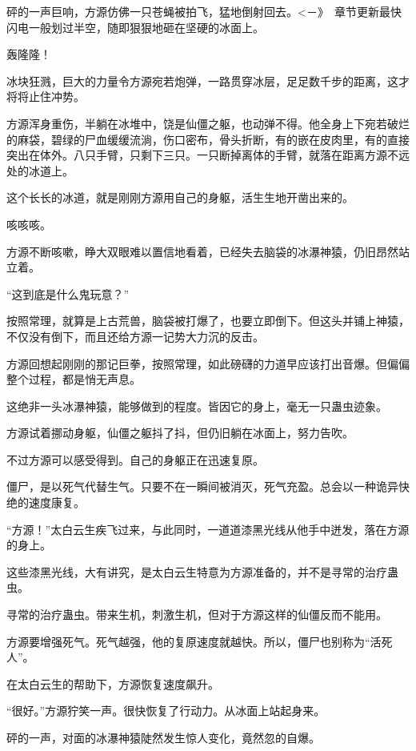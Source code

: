 
\begin{this_body}

砰的一声巨响，方源仿佛一只苍蝇被拍飞，猛地倒射回去。<－》　章节更新最快闪电一般划过半空，随即狠狠地砸在坚硬的冰面上。

轰隆隆！

冰块狂溅，巨大的力量令方源宛若炮弹，一路贯穿冰层，足足数千步的距离，这才将将止住冲势。

方源浑身重伤，半躺在冰堆中，饶是仙僵之躯，也动弹不得。他全身上下宛若破烂的麻袋，碧绿的尸血缓缓流淌，伤口密布，骨头折断，有的嵌在皮肉里，有的直接突出在体外。八只手臂，只剩下三只。一只断掉离体的手臂，就落在距离方源不远处的冰道上。

这个长长的冰道，就是刚刚方源用自己的身躯，活生生地开凿出来的。

咳咳咳。

方源不断咳嗽，睁大双眼难以置信地看着，已经失去脑袋的冰瀑神猿，仍旧昂然站立着。

“这到底是什么鬼玩意？”

按照常理，就算是上古荒兽，脑袋被打爆了，也要立即倒下。但这头并铺上神猿，不仅没有倒下，而且还给方源一记势大力沉的反击。

方源回想起刚刚的那记巨拳，按照常理，如此磅礴的力道早应该打出音爆。但偏偏整个过程，都是悄无声息。

这绝非一头冰瀑神猿，能够做到的程度。皆因它的身上，毫无一只蛊虫迹象。

方源试着挪动身躯，仙僵之躯抖了抖，但仍旧躺在冰面上，努力告吹。

不过方源可以感受得到。自己的身躯正在迅速复原。

僵尸，是以死气代替生气。只要不在一瞬间被消灭，死气充盈。总会以一种诡异快绝的速度康复。

“方源！”太白云生疾飞过来，与此同时，一道道漆黑光线从他手中迸发，落在方源的身上。

这些漆黑光线，大有讲究，是太白云生特意为方源准备的，并不是寻常的治疗蛊虫。

寻常的治疗蛊虫。带来生机，刺激生机，但对于方源这样的仙僵反而不能用。

方源要增强死气。死气越强，他的复原速度就越快。所以，僵尸也别称为“活死人”。

在太白云生的帮助下，方源恢复速度飙升。

“很好。”方源狞笑一声。很快恢复了行动力。从冰面上站起身来。

砰的一声，对面的冰瀑神猿陡然发生惊人变化，竟然忽的自爆。


\end{this_body}
